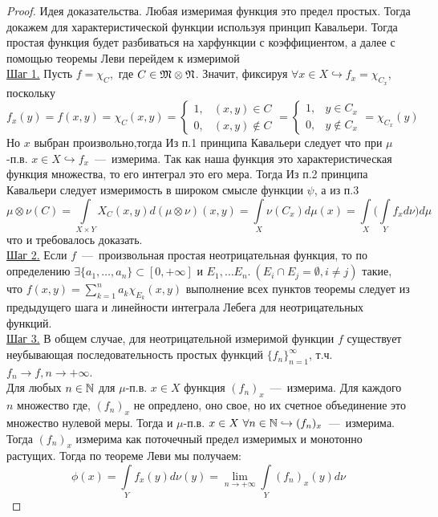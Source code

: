 \begin{proof}
Идея доказательства. Любая измеримая функция это предел простых. Тогда докажем для характеристической функции используя принцип Кавальери. Тогда простая функция будет разбиваться на харфункции с коэффициентом, а далее с помощью теоремы Леви перейдем к измеримой\\
\underline{Шаг 1.} Пусть $f = \chi_C,$ где $ C \in \mathfrak{M} \otimes \mathfrak{N}$. Значит, фиксируя $\forall x \in X \hookrightarrow f_x = \chi_{C_x}$, поскольку 
\[f_x(y) = f(x, y) = \chi_C(x, y) = \begin{cases}
    1, & (x, y) \in C \\ 0, & (x, y) \notin C
\end{cases} = \begin{cases}
    1, & y \in C_x \\ 0, & y \notin C_x
\end{cases} = \chi_{C_x}(y)\]
Но $x$ выбран произвольно,тогда Из п.1 принципа Кавальери следует что при $\mu$-п.в. $x \in X \hookrightarrow f_x$~---~измерима. Так как наша функция это характеристическая функция множества, то его интеграл это его мера. Тогда Из п.2 принципа Кавальери следует измеримость в широком смысле функции $\psi$, а из п.3 \[ \mu \otimes \nu (C) = \int\limits_{X \times Y} X_C(x, y)d(\mu\otimes\nu)(x, y) = \int\limits_X \nu(C_x)d\mu(x) = \int\limits_X\biggl(\int\limits_Y f_xd\nu\biggr)d\mu\] что и требовалось доказать. \\
\underline{Шаг 2.} Если $f$~---~произвольная простая неотрицательная функция, то по определению $\exists \{a_1, \ldots, a_n\} \subset [0, +\infty]$ и $E_1, \ldots E_n. \  (E_i \cap E_j = \emptyset, i\neq j)$ такие, что $f(x, y) = \sum\limits_{k = 1}^n a_k\chi_{E_k}(x, y)$ выполнение всех пунктов теоремы следует из предыдущего шага и линейности интеграла Лебега для неотрицательных функций. \\
\underline{Шаг 3.} В общем случае, для неотрицательной измеримой функции $f$ существует неубывающая последовательность простых функций $\{f_n\}_{n=1}^{\infty}$, т.ч. $f_n \rightarrow f, n \rightarrow +\infty$.\\
Для любых $n \in \mathbb{N}$ для $\mu$-п.в. $x \in X$ функция $(f_n)_x$~---~измерима. Для каждого $n$ множество где, $(f_n)_x$ не опредлено, оно свое, но их счетное объединение это множество нулевой меры. Тогда и $\mu$-п.в. $x \in X \ \forall n \in \mathbb{N} \hookrightarrow  (f_n)_x$~---~измерима. Тогда $(f_n)_x$ измерима как поточечный предел измеримых и монотонно растущих. Тогда по теореме Леви мы получаем: \[\phi(x) = \int\limits_Y f_x(y)d\nu(y) = \lim\limits_{n \rightarrow +\infty} \int\limits_Y (f_n)_x(y) d\nu\]

\end{proof}
